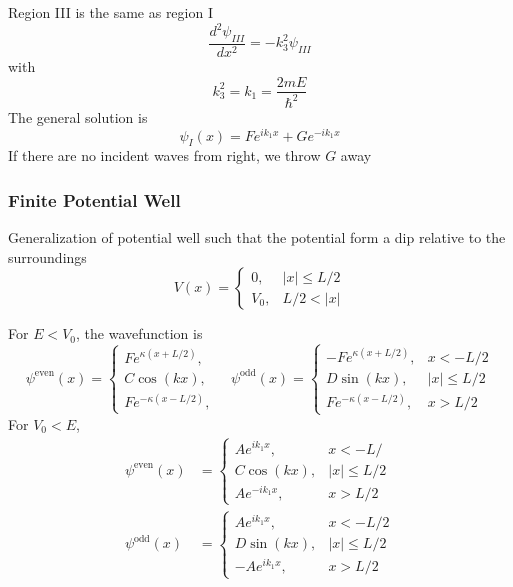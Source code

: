 \documentclass[../../../main.tex]{subfiles}
\begin{document}
Region III is the same as region I
\begin{equation*}
  \frac{d^2 \psi_{III}}{dx^2} = - k_3^2 \psi_{III}
\end{equation*}
with
\begin{equation*}
  k_3^2 =k_1=\frac{2 m E}{\hbar^2}
\end{equation*}
The general solution is
\begin{equation*}
  \psi_I(x) = F e^{i k_1 x} + G e^{-i k_1 x}
\end{equation*}
If there are no incident waves from right, we throw $G$ away

\subsubsection{Finite Potential Well}
Generalization of potential well such that the potential form a dip relative to the surroundings
\begin{equation*}
  V(x)=
  \begin{cases}
    0,   & |x|\leq L/2 \\
    V_0, & L/2 <|x|
  \end{cases}
\end{equation*}

For $E<V_0$, the wavefunction is
\begin{equation*}
  \psi^{\text{even}}(x) =
  \begin{cases}
    F e^{\kappa (x + L/2)}, \\
    C \cos(k x),            \\
    F e^{-\kappa (x - L/2)},
  \end{cases}
  \quad
  \psi^{\text{odd}}(x) =
  \begin{cases}
    - F e^{\kappa (x + L/2)}, & x < -L/2    \\
    D \sin(k x),              & |x| \le L/2 \\
    F e^{-\kappa (x - L/2)},  & x > L/2
  \end{cases}
\end{equation*}
For $V_0<E$,
\begin{align*}
  \psi^{\text{even}}(x) & =
  \begin{cases}
    A e^{i k_1 x} , & x < -L/     \\
    C \cos(k x),    & |x| \le L/2 \\
    A e^{-i k_1 x}, & x > L/2
  \end{cases}
  \\
  \psi^{\text{odd}}(x)  & =
  \begin{cases}
    A e^{i k_1 x},   & x < -L/2    \\
    D \sin(k x),     & |x| \le L/2 \\
    -A e^{i k_1 x} , & x > L/2
  \end{cases}
\end{align*}
\end{document}
